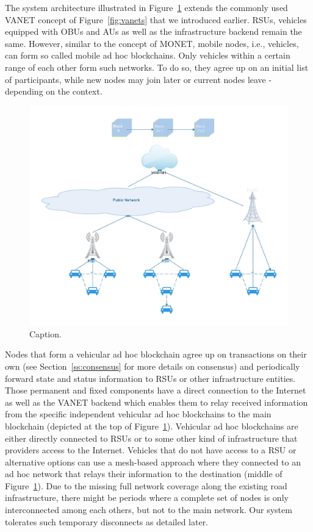 \documentclass{llncs}
\begin{document}
{			The system architecture illustrated in Figure~\ref{fig:architecture-overview} extends the commonly used VANET concept of Figure~\ref{fig:vanets} that we introduced earlier. RSUs, vehicles equipped with OBUs and AUs as well as the infrastructure backend remain the same. However, similar to the concept of MONET, mobile nodes, i.e., vehicles, can form so called mobile ad hoc blockchains. Only vehicles within a certain range of each other form such networks. To do so, they agree up on an initial list of participants, while new nodes may join later or current nodes leave - depending on the context.		
			\begin{figure}[H]
				\centering
				\includegraphics[scale=0.5]{Figures/20180904_monet-vanet.pdf}
				\caption{Caption.}
				\label{fig:architecture-overview}
			\end{figure}
			Nodes that form a vehicular ad hoc blockchain agree up on transactions on their own (see Section~\ref{ss:consensus} for more details on consensus) and periodically forward state and status information to RSUs or other infrastructure entities. Those permanent and fixed components have a direct connection to the Internet as well as the VANET backend which enables them to relay received information from the specific independent vehicular ad hoc blockchains to the main blockchain (depicted at the top of Figure~\ref{fig:architecture-overview}). Vehicular ad hoc blockchains are either directly connected to RSUs or to some other kind of infrastructure that providers access to the Internet. Vehicles that do not have access to a RSU or alternative options can use a mesh-based approach where they connected to an ad hoc network that relays their information to the destination (middle of Figure~\ref{fig:architecture-overview}). Due to the missing full network coverage along the existing road infrastructure, there might be periods where a complete set of nodes is only interconnected among each others, but not to the main network. Our system tolerates such temporary disconnects as detailed later.

}
\end{document}
